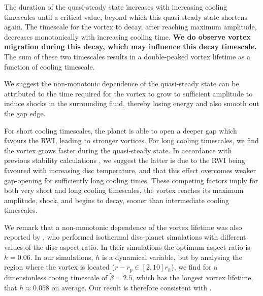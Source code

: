 The duration of the quasi-steady state increases with
increasing cooling timescales until a critical value, beyond which this
quasi-steady state shortens again. The timescale for the vortex to
decay, after reaching maximum amplitude, decreases monotonically with
increasing cooling time. {\bf We do observe vortex migration during this
  decay, which may influence this decay timescale. } 
The sum of
these two timescales results in a double-peaked vortex lifetime as a
function of cooling timescale. 


We suggest the non-monotonic dependence of the quasi-steady state can
be attributed to the time required for the vortex to grow to 
sufficient amplitude to induce shocks in the surrounding fluid,
thereby losing energy and also smooth out the gap edge.   

For short cooling timescales, the planet is able to open a
deeper gap which favours the RWI, leading to stronger 
vortices. For long cooling timescales, we find the vortex
grows faster during the quasi-steady state. In accordance with
previous stability calculations \citep{li00}, we 
suggest the latter is due to the RWI being favoured with increasing
disc temperature, and that this effect overcomes weaker
gap-opening for sufficiently long cooling times. 
These competing factors imply
for both very short and long cooling timescales, the vortex reaches
its maximum amplitude, shock, and begins to decay, sooner than
intermediate cooling timescales.      


We remark that a non-monotonic dependence of the vortex lifetime was
also reported by \cite{fu14}, who performed isothermal disc-planet
simulations with different values of the   
disc aspect ratio. In their simulations the optimum aspect ratio is
$h=0.06$. In our simulations, $h$ is a dynamical
variable, but by analysing the region where the vortex is located
($r-r_p\in[2,10]r_h$), %
we find for a dimensionless cooing timescale of $\tilde\beta=2.5$, which has
the longest vortex lifetime, that  
$h\approx0.058$ on average.  
Our result is therefore consistent with \citep{fu14}. 

